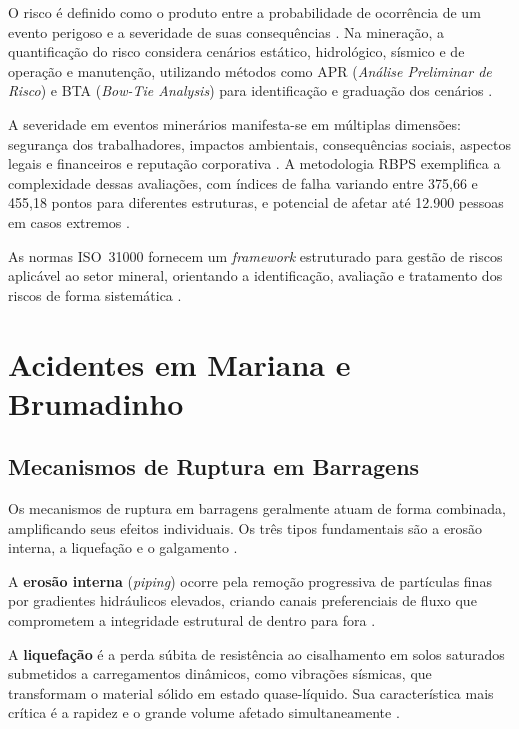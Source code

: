 O risco é definido como o produto entre a probabilidade de ocorrência de um evento perigoso e a severidade de suas consequências \cite{sistemaeso2021avaliacao, sistemaeso2021matriz}. Na mineração, a quantificação do risco considera cenários estático, hidrológico, sísmico e de operação e manutenção, utilizando métodos como APR (\textit{Análise Preliminar de Risco}) e BTA (\textit{Bow-Tie Analysis}) para identificação e graduação dos cenários \cite{conceicao2018, vilaca2021}.

A severidade em eventos minerários manifesta-se em múltiplas dimensões: segurança dos trabalhadores, impactos ambientais, consequências sociais, aspectos legais e financeiros e reputação corporativa \cite{vilaca2021}. A metodologia RBPS exemplifica a complexidade dessas avaliações, com índices de falha variando entre 375,66 e 455,18 pontos para diferentes estruturas, e potencial de afetar até 12.900 pessoas em casos extremos \cite{conceicao2018}.

As normas ISO~31000 fornecem um \textit{framework} estruturado para gestão de riscos aplicável ao setor mineral, orientando a identificação, avaliação e tratamento dos riscos de forma sistemática \cite{cruz2024iso, ministeriotransportes2018}.

\section{Acidentes em Mariana e Brumadinho}
\label{sec:acidentes}

\subsection{Mecanismos de Ruptura em Barragens}

Os mecanismos de ruptura em barragens geralmente atuam de forma combinada, amplificando seus efeitos individuais. Os três tipos fundamentais são a erosão interna, a liquefação e o galgamento \cite{arnez1999avaliacao}.

A \textbf{erosão interna} (\textit{piping}) ocorre pela remoção progressiva de partículas finas por gradientes hidráulicos elevados, criando canais preferenciais de fluxo que comprometem a integridade estrutural de dentro para fora \cite{arnez1999avaliacao}.

A \textbf{liquefação} é a perda súbita de resistência ao cisalhamento em solos saturados submetidos a carregamentos dinâmicos, como vibrações sísmicas, que transformam o material sólido em estado quase-líquido. Sua característica mais crítica é a rapidez e o grande volume afetado simultaneamente \cite{arnez1999avaliacao}.

